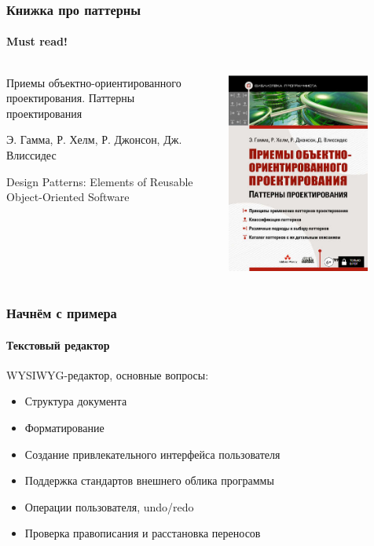 \documentclass[xetex,mathserif,serif]{beamer}
\begin{document}
	\begin{frame}
		\frametitle{Книжка про паттерны}
		\framesubtitle{Must read!}

		\begin{columns}
			\begin{column}{0.6\textwidth}
				Приемы объектно-ориентированного проектирования. Паттерны проектирования

				Э. Гамма, Р. Хелм, Р. Джонсон, Дж. Влиссидес

				Design Patterns: Elements of Reusable Object-Oriented Software
			\end{column}
			\begin{column}{0.4\textwidth}
				\begin{center}
					\includegraphics[width=0.8\textwidth]{patternBookCover.png}
				\end{center}
			\end{column}
		\end{columns}
	\end{frame}

	\begin{frame}
		\frametitle{Начнём с примера}
		\framesubtitle{Текстовый редактор}
		WYSIWYG-редактор, основные вопросы:
		\begin{itemize}
			\item Структура документа
			\item Форматирование
			\item Создание привлекательного интерфейса пользователя
			\item Поддержка стандартов внешнего облика программы
			\item Операции пользователя, undo/redo
			\item Проверка правописания и расстановка переносов
		\end{itemize}
	\end{frame}
\end{document}
